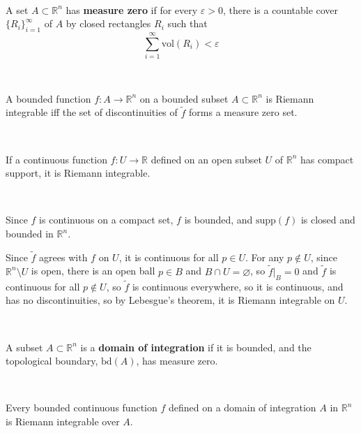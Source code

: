 \documentclass{article}
\begin{document}
\begin{definition}[Measure]
  \

  A set $A \subset \mathbb{R}^n$ has \textbf{measure zero} if for every $\varepsilon > 0$, there is a countable cover $\{R_i\}_{i=1}^\infty$ of $A$ by closed rectangles $R_i$ such that $$\sum_{i=1}^\infty \text{vol}(R_i) < \varepsilon$$
\end{definition}

\begin{theorem}
  \

  A bounded function $f: A \to \mathbb{R}^n$ on a bounded subset $A \subset \mathbb{R}^n$ is Riemann integrable iff the set of discontinuities of $\tilde{f}$ forms a measure zero set.
\end{theorem}

\begin{proposition}
  \

  If a continuous function $f: U \to \mathbb{R}$ defined on an open subset $U$ of $\mathbb{R}^n$ has compact support, it is Riemann integrable.
\end{proposition}

\begin{customproof}
  \

  Since $f$ is continuous on a compact set, $f$ is bounded, and $\text{supp}(f)$ is closed and bounded in $\mathbb{R}^n$.

  Since $\tilde{f}$ agrees with $f$ on $U$, it is continuous for all $p \in U$. For any $p \notin U$, since $\mathbb{R}^n \setminus U$ is open, there is an open ball $p \in B$ and $B \cap U = \varnothing$, so $\tilde{f}\vert_B = 0$ and $\tilde{f}$ is continuous for all $p \notin U$, so $\tilde{f}$ is continuous everywhere, so it is continuous, and has no discontinuities, so by Lebesgue's theorem, it is Riemann integrable on $U$.
\end{customproof}

\begin{definition}
  \

  A subset $A \subset \mathbb{R}^n$ is a \textbf{domain of integration} if it is bounded, and the topological boundary, $\text{bd}(A)$, has measure zero.
\end{definition}

\begin{proposition}
  \

  Every bounded continuous function $f$ defined on a domain of integration $A$ in $\mathbb{R}^n$ is Riemann integrable over $A$.
\end{proposition}
\end{document}
